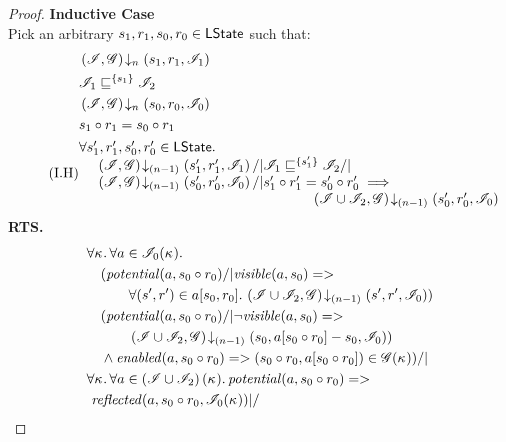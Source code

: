 \begin{lemma}
\begin{proof}
\noindent\textbf{Inductive Case}\\
Pick an arbitrary $s_1, r_1, s_0, r_0 \in \textsf{LState}$ such that:
\begin{align}
	&\extendsAMUpto{\lmod, \gmod}{n}{s_1}{r_1}{\lmod_1} \label{LSC2:Ass1}\\
	&\lmod_1 \weakenI{\{s_1\}} \lmod_2 \label{LSC2:Ass2}\\
	& \extendsAMUpto{\lmod, \gmod}{n}{s_0}{r_0}{\lmod_0} \label{LSC2:Ass3}\\
	& s_1 \composeL r_1 = s_0 \composeL r_1 \label{LSC2:Ass4}\\
	\tag{I.H}	
	&\begin{array}{@{} l @{\hspace{-3cm}} l @{\hspace*{-2cm}} l @{}}
		\for{s'_1, r'_1, s'_0, r'_0 \in \LStates} &&\\
		& \extendsAMUpto{\lmod, \gmod}{(n-1)}{s'_1}{r'_1}{\lmod_1} /| \lmod_1 \weakenI{\{s'_1\}} \lmod_2 /| & \\
		& \extendsAMUpto{\lmod, \gmod}{(n-1)}{s'_0}{r'_0}{\lmod_0} /| s'_1 \composeL r'_1 = s'_0 \composeL r'_0 \implies & \\
		&& \extendsAMUpto{\lmod \cup \lmod_2, \gmod}{(n-1)}{s'_0}{r'_0}{\lmod_0}
	\end{array} \label{LSC2:IH}
\end{align}
%
\textbf{RTS. } 
%
\begin{align}
	& 
	\V{\ca{}}  \V{a\in \lmod_0(\ca{})} \nonumber \\
  &\quad (\m{potential}(a,s_0 \composeL r_0) /| \m{visible}(a, s_0) => \nonumber\\
  & \quad\qquad\for{(s', r') \in a[s_0, r_0]} \extendsAMUpto{\lmod \cup \lmod_2, \gmod}{(n-1)}{s'}{r'}{\lmod_0}) \label{LSC2:Goal0}\\
% 
	&\quad (\m{potential}(a,s_0 \composeL r_0) /| \neg\m{visible}(a, s_0) => \nonumber\\
  & \quad\qquad \extendsAMUpto{\lmod \cup \lmod_2, \gmod}{(n-1)}{s_0}{a[s_0 \composeL r_0] - s_0}{\lmod_0}) \label{LSC2:Goal1}\\
%   
  &\quad\land \m{enabled}(a,s_0 \composeL r_0)
  => (s_0 \composeL r_0, a[s_0 \composeL r_0])\in \gmod(\ca{}))
  /|\null \label{LSC2:Goal2}\\
%  
  &\V{\ca{}}\V{a\in \left(\lmod \cup \lmod_2 \right) (\ca{})}
  \m{potential}(a, s_0 \composeL r_0) =>\null \nonumber \\
  &\ \m{reflected}(a, s_0 \composeL r_0,\lmod_0(\ca{})) |/\null \nonumber \\

\end{align}
\end{proof}
\end{lemma}
